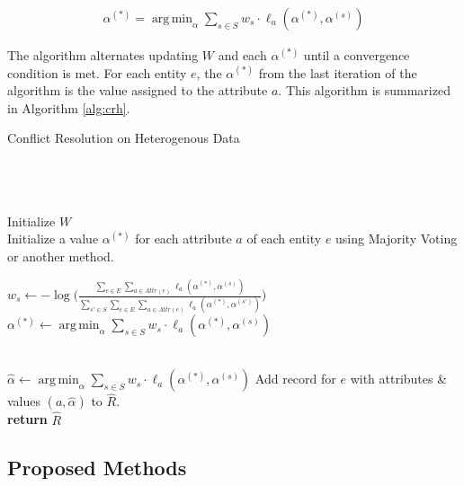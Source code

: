 \documentclass{acm_proc_article-sp}
\DeclareMathOperator*{\argmin}{arg\,min}
\begin{document}
\begin{align}
\alpha^{(*)} = \argmin_\alpha \sum_{s \in S} w_s \cdot \ell_a(\alpha^{(*)}, \alpha^{(s)})
\end{align}

The algorithm alternates updating $W$ and each $\alpha^{(*)}$ until a convergence condition is met. For each entity $e$, the $\alpha^{(*)}$ from the last iteration of the algorithm is the value assigned to the attribute $a$. This algorithm is summarized in Algorithm \ref{alg:crh}. 


\begin{algorithm}
\small
\caption{Conflict Resolution on Heterogenous Data}
\begin{algorithmic}[1]
 \\
 \\
 \\

\State Initialize $W$ \\

\State Initialize a value $\alpha^(*)$ for each attribute $a$ of each entity $e$ using Majority Voting or another method. 

\State $w_s \leftarrow - \log \big ( \frac{\sum_{e \in E} \sum_{a \in Attr(e)} \ell_a(\alpha^{(*)}, \alpha^{(s)})}{\sum_{s' \in S} \sum_{e \in E}  \sum_{a \in Attr(e)} \ell_a(\alpha^{(*)}, \alpha^{(s')})} \big )$
\State $\alpha^{(*)} \leftarrow \argmin_\alpha \sum_{s \in S} w_s \cdot \ell_a(\alpha^{(*)}, \alpha^{(s)})$
\EndFor
\EndFor
\EndWhile

\\

\State $\hat{\alpha} \leftarrow \argmin_\alpha \sum_{s \in S} w_s \cdot \ell_a(\alpha^{(*)}, \alpha^{(s)})$
\EndFor
\State Add record for $e$ with attributes \& values $(a, \hat{\alpha})$ to $\hat{R}$.
\EndFor
\\

\State \textbf{return} $\hat{R}$
\EndFunction
\end{algorithmic}
\label{alg:crh}
\end{algorithm}  


\subsection{Proposed Methods}
\end{document}

